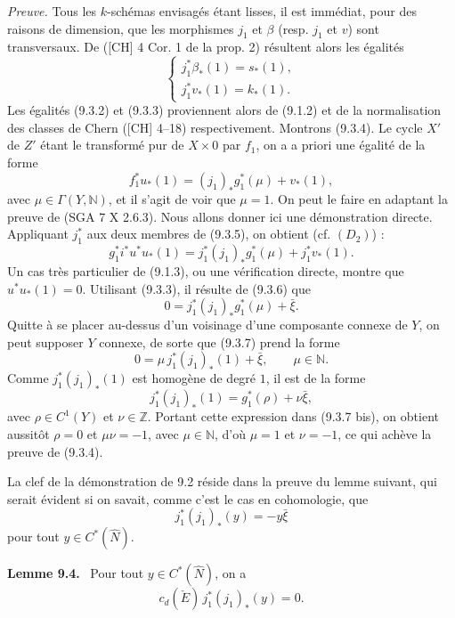 \documentclass[11pt]{article}
\newenvironment{statement}[1]{\par\medskip\noindent\textbf{#1.}\ }{\par\medskip}
\begin{document}
\emph{Preuve.} Tous les $k$-schémas envisagés étant lisses, il est immédiat, pour des raisons de dimension, que les morphismes $j_1$ et $\beta$ (resp. $j_1$ et $v$) sont transversaux. De ([CH] 4 Cor. 1 de la prop. 2) résultent alors les égalités
\[
\begin{cases}
j_1^*\beta_*(1)=s_*(1),\\
j_1^*v_*(1)=k_*(1).
\end{cases}
\]
Les égalités (9.3.2) et (9.3.3) proviennent alors de (9.1.2) et de la normalisation des classes de Chern ([CH] 4--18) respectivement. Montrons (9.3.4). Le cycle $X'$ de $Z'$ étant le transformé pur de $X\times0$ par $f_1$, on a a priori une égalité de la forme
\[
f_1^*u_*(1)=(j_1)_*g_1^*(\mu)+v_*(1),
\tag{9.3.5}
\]
avec $\mu\in\Gamma(Y,\mathbb N)$, et il s'agit de voir que $\mu=1$. On peut le faire en adaptant la preuve de (SGA 7 X 2.6.3). Nous allons donner ici une démonstration directe. Appliquant $j_1^*$ aux deux membres de (9.3.5), on obtient (cf. $(D_2)$) :
\[
g_1^*i^*u^*u_*(1)=j_1^*(j_1)_*g_1^*(\mu)+j_1^*v_*(1).
\tag{9.3.6}
\]
Un cas très particulier de (9.1.3), ou une vérification directe, montre que $u^*u_*(1)=0$. Utilisant (9.3.3), il résulte de (9.3.6) que
\[
0=j_1^*(j_1)_*g_1^*(\mu)+\bar\xi.
\tag{9.3.7}
\]
Quitte à se placer au-dessus d'un voisinage d'une composante connexe de $Y$, on peut supposer $Y$ connexe, de sorte que (9.3.7) prend la forme
\[
0=\mu\,j_1^*(j_1)_*(1)+\bar\xi,\qquad \mu\in\mathbb N.
\tag{9.3.7 bis}
\]
Comme $j_1^*(j_1)_*(1)$ est homogène de degré $1$, il est de la forme
\[
j_1^*(j_1)_*(1)=g_1^*(\rho)+\nu\bar\xi,
\]
avec $\rho\in C^1(Y)$ et $\nu\in\mathbb Z$. Portant cette expression dans (9.3.7 bis), on obtient aussitôt $\rho=0$ et $\mu\nu=-1$, avec $\mu\in\mathbb N$, d'où $\mu=1$ et $\nu=-1$, ce qui achève la preuve de (9.3.4).

La clef de la démonstration de 9.2 réside dans la preuve du lemme suivant, qui serait évident si on savait, comme c'est le cas en cohomologie, que
\[
j_1^*(j_1)_*(y)=-y\bar\xi
\]
pour tout $y\in C^*(\widehat N)$.

\begin{statement}{Lemme 9.4}
Pour tout $y\in C^*(\widehat N)$, on a
\[
c_d(\check E)\,j_1^*(j_1)_*(y)=0.
\]
\end{statement}
\end{document}

